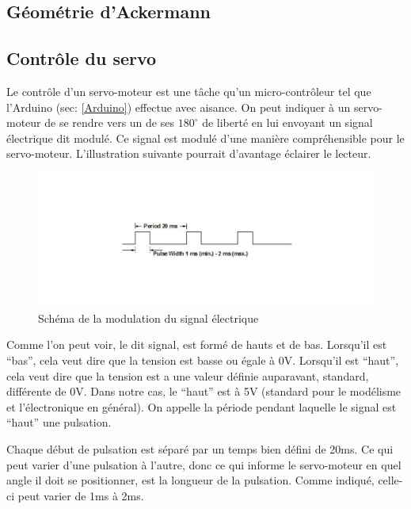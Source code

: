 \documentclass[a4paper,11pt]{report}
\begin{document}
{\subsection{Géométrie d'Ackermann}

\subsection{Contrôle du servo}\label{servosection}
Le contrôle d'un servo-moteur est une tâche qu'un micro-contrôleur tel que
l'Arduino (sec: \ref{Arduino}) effectue avec aisance. On peut indiquer à un servo-moteur de se rendre vers
un de ses $180^{\circ}$ de liberté en lui envoyant un signal électrique dit
modulé. Ce signal est modulé d'une manière compréhensible pour le
servo-moteur. L'illustration suivante
pourrait d'avantage éclairer le lecteur.

\begin{figure}[h]
\centering
\includegraphics[width=1.0\textwidth]{figures/ServoPwm}
    \caption[Signal modulé]{\label{ServoPwm}Schéma de la modulation du signal
      \'electrique \protect
      \cite{WikiServo}
    }
\end{figure}

Comme l'on peut voir, le dit signal, est form\'e de hauts et de
bas. Lorsqu'il est ``bas'', cela veut dire que la tension est basse ou égale
à 0V. Lorsqu'il est
``haut'', cela veut dire que la tension est a une valeur définie auparavant,
standard, différente de 0V. Dans notre cas, le ``haut'' est à 5V (standard
pour le modélisme et l'électronique en général). On appelle la
période pendant laquelle le signal est ``haut'' une pulsation.

Chaque début de pulsation est séparé par un temps bien défini de
20ms. Ce qui peut varier d'une pulsation \`a l'autre, donc ce qui informe le
servo-moteur en quel angle il doit se positionner, est la longueur de la
pulsation. Comme indiqué, celle-ci peut varier de 1ms \`a 2ms.

}
\end{document}
